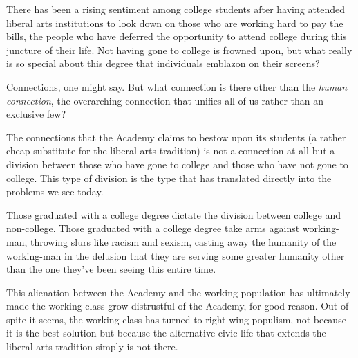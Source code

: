 \documentclass[12pt,letterpaper]{article}
\begin{document}
There has been a rising sentiment among college students after having attended liberal arts institutions to look down on those who are working hard to pay the bills, the people who have deferred the opportunity to attend college during this juncture of their life.  Not having gone to college is frowned upon, but what really is so special about this degree that individuals emblazon on their screens?

Connections, one might say.  But what connection is there other than the \textit{human connection}, the overarching connection that unifies all of us rather than an exclusive few?

The connections that the Academy claims to bestow upon its students (a rather cheap substitute for the liberal arts tradition) is not a connection at all but a division between those who have gone to college and those who have not gone to college.  This type of division is the type that has translated directly into the problems we see today.

Those graduated with a college degree dictate the division between college and non-college.  Those graduated with a college degree take arms against working-man, throwing slurs like racism and sexism, casting away the humanity of the working-man in the delusion that they are serving some greater humanity other than the one they've been seeing this entire time.

This alienation between the Academy and the working population has ultimately made the working class grow distrustful of the Academy, for good reason.  Out of spite it seems, the working class has turned to right-wing populism, not because it is the best solution but because the alternative civic life that extends the liberal arts tradition simply is not there.


%
%
%
%
%
%
\end{document}
